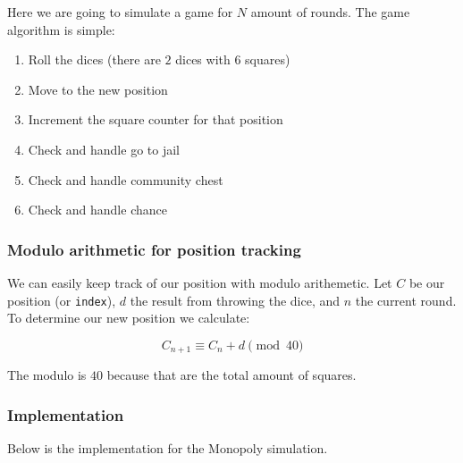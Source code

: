 \documentclass[11pt]{article}
\providecommand{\tightlist}{%
      \setlength{\itemsep}{0pt}\setlength{\parskip}{0pt}}
\begin{document}
    Here we are going to simulate a game for \(N\) amount of rounds. The
game algorithm is simple:

\begin{enumerate}
\def\labelenumi{\arabic{enumi}.}
\tightlist
\item
  Roll the dices (there are \(2\) dices with \(6\) squares)
\item
  Move to the new position
\item
  Increment the square counter for that position
\item
  Check and handle go to jail
\item
  Check and handle community chest
\item
  Check and handle chance
\end{enumerate}

    \hypertarget{modulo-arithmetic-for-position-tracking}{%
\subsubsection{Modulo arithmetic for position
tracking}\label{modulo-arithmetic-for-position-tracking}}

    We can easily keep track of our position with modulo arithemetic. Let
\(C\) be our position (or \texttt{index}), \(d\) the result from
throwing the dice, and \(n\) the current round. To determine our new
position we calculate:

\[ C_{n+1} \equiv C_n+d \pmod{40}\]

    The modulo is \(40\) because that are the total amount of squares.

    \hypertarget{implementation}{%
\subsubsection{Implementation}\label{implementation}}

    Below is the implementation for the Monopoly simulation.
\end{document}
